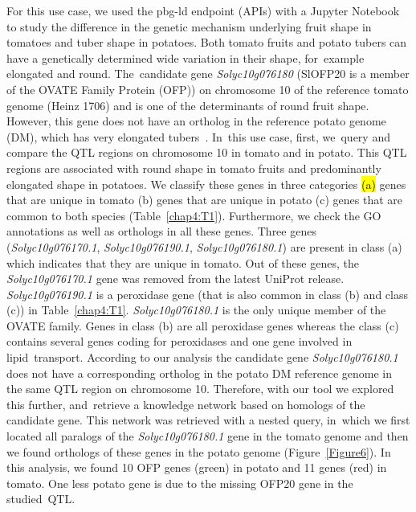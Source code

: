 \documentclass[applsci,article,accept,moreauthors,pdftex]{Definitions/mdpi}
\begin{document}
{For this use case, we used the pbg-ld endpoint (APIs) with a Jupyter Notebook \cite{Notebooks} %
to study the difference in the genetic mechanism underlying fruit shape in tomatoes and tuber shape in potatoes. %
Both tomato fruits and potato tubers can have a genetically determined wide variation in their shape, for~example elongated and round. The~candidate gene \textit{Solyc10g076180} (SlOFP20 is a member of the OVATE Family Protein (OFP)) on chromosome 10 of the reference tomato genome (Heinz 1706) and is one of the determinants of round fruit shape. However, this gene does not have an ortholog in the reference potato genome (DM), which has very elongated tubers~\cite{wu2018common}. In~this use case, first, we~query and compare the QTL regions on chromosome 10 in tomato and in potato. This QTL regions are associated with round shape in tomato fruits and predominantly elongated shape in potatoes. We classify these genes in three categories \hl{(a)} %
genes that are unique in tomato (b) genes that are unique in potato (c) genes that are common to both species (Table~\ref{chap4:T1}). %
Furthermore, we check the GO annotations as well as orthologs in all these genes. Three genes (\textit{Solyc10g076170.1}, \textit{Solyc10g076190.1}, \textit{Solyc10g076180.1}) are present in class (a) which indicates that they are unique in tomato.
Out of these genes, %
the \textit{Solyc10g076170.1} gene was removed from the latest UniProt release. \textit{Solyc10g076190.1} is a peroxidase gene (that is also common in class (b) and class (c)) in Table~\ref{chap4:T1}. %
\textit{Solyc10g076180.1} is the only unique member of the OVATE family. Genes in class (b) are all peroxidase genes whereas %
the class (c) contains several genes coding for peroxidases and one gene involved in lipid~transport.
According to our analysis the candidate gene \textit{Solyc10g076180.1} does not have a corresponding ortholog in the potato DM reference genome in the same QTL region on chromosome 10.
Therefore, with our tool we explored %
this further, and~retrieve a knowledge network based on homologs of the candidate gene. %
This network was retrieved with a nested query, in~which we first located all paralogs of the \textit{Solyc10g076180.1} gene in the tomato genome and then we found orthologs of these genes in the potato genome (Figure~\ref{Figure6}). %
In this analysis, we found %
10 OFP genes (green) in potato and 11 genes (red) in tomato. %
One less potato gene %
is due to the missing OFP20 gene in the studied~QTL. 

}
\end{document}
